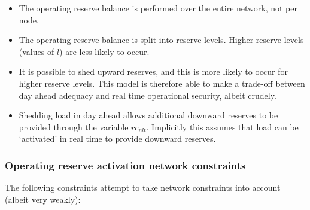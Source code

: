 \documentclass[number,times]{elsarticle}
\begin{document}
\begin{itemize}
    \item The operating reserve balance is performed over the entire network, not per node.
    \item The operating reserve balance is split into reserve levels. Higher reserve levels (values of $l$) are less likely to occur.
    \item It is possible to shed upward reserves, and this is more likely to occur for higher reserve levels. This model is therefore able to make a trade-off between day ahead adequacy and real time operational security, albeit crudely.
    \item Shedding load in day ahead allows additional downward reserves to be provided through the variable $rc_{nlt}$. Implicitly this assumes that load can be `activated' in real time to provide downward reserves.
\end{itemize}

\subsubsection{Operating reserve activation network constraints} \label{sec:operating_reserve_network_activation_constraints}

The following constraints attempt to take network constraints into account (albeit very weakly):
\end{document}
